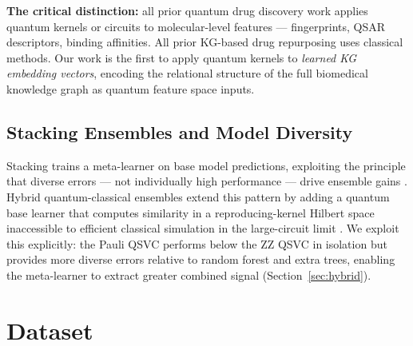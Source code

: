 \documentclass[twocolumn,10pt]{article}
\begin{document}
\textbf{The critical distinction:} all prior quantum drug discovery work applies quantum kernels or circuits to molecular-level features --- fingerprints, QSAR descriptors, binding affinities. All prior KG-based drug repurposing uses classical methods. Our work is the first to apply quantum kernels to \textit{learned KG embedding vectors}, encoding the relational structure of the full biomedical knowledge graph as quantum feature space inputs.

\subsection{Stacking Ensembles and Model Diversity}

Stacking trains a meta-learner on base model predictions, exploiting the principle that diverse errors --- not individually high performance --- drive ensemble gains \cite{wolpert1992}. Hybrid quantum-classical ensembles extend this pattern by adding a quantum base learner that computes similarity in a reproducing-kernel Hilbert space inaccessible to efficient classical simulation in the large-circuit limit \cite{havlicek2019,schuld2019,liu2021,abbas2021,incudini2023}. We exploit this explicitly: the Pauli QSVC performs below the ZZ QSVC in isolation but provides more diverse errors relative to random forest and extra trees, enabling the meta-learner to extract greater combined signal (Section~\ref{sec:hybrid}).

\section{Dataset}
\end{document}
